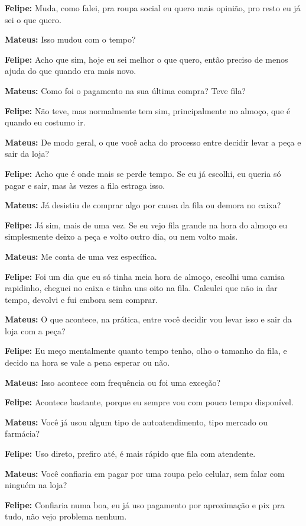 \textbf{Felipe:} Muda, como falei, pra roupa social eu quero mais opinião, pro resto eu já sei o que quero.

\textbf{Mateus:} Isso mudou com o tempo?

\textbf{Felipe:} Acho que sim, hoje eu sei melhor o que quero, então preciso de menos ajuda do que quando era mais novo.

\textbf{Mateus:} Como foi o pagamento na sua última compra? Teve fila?

\textbf{Felipe:} Não teve, mas normalmente tem sim, principalmente no almoço, que é quando eu costumo ir.

\textbf{Mateus:} De modo geral, o que você acha do processo entre decidir levar a peça e sair da loja?

\textbf{Felipe:} Acho que é onde mais se perde tempo. Se eu já escolhi, eu queria só pagar e sair, mas às vezes a fila estraga isso.

\textbf{Mateus:} Já desistiu de comprar algo por causa da fila ou demora no caixa?

\textbf{Felipe:} Já sim, mais de uma vez. Se eu vejo fila grande na hora do almoço eu simplesmente deixo a peça e volto outro dia, ou nem volto mais.

\textbf{Mateus:} Me conta de uma vez específica.

\textbf{Felipe:} Foi um dia que eu só tinha meia hora de almoço, escolhi uma camisa rapidinho, cheguei no caixa e tinha uns oito na fila. Calculei que não ia dar tempo, devolvi e fui embora sem comprar.

\textbf{Mateus:} O que acontece, na prática, entre você decidir vou levar isso e sair da loja com a peça?

\textbf{Felipe:} Eu meço mentalmente quanto tempo tenho, olho o tamanho da fila, e decido na hora se vale a pena esperar ou não.

\textbf{Mateus:} Isso acontece com frequência ou foi uma exceção?

\textbf{Felipe:} Acontece bastante, porque eu sempre vou com pouco tempo disponível.

\textbf{Mateus:} Você já usou algum tipo de autoatendimento, tipo mercado ou farmácia?

\textbf{Felipe:} Uso direto, prefiro até, é mais rápido que fila com atendente.

\textbf{Mateus:} Você confiaria em pagar por uma roupa pelo celular, sem falar com ninguém na loja?

\textbf{Felipe:} Confiaria numa boa, eu já uso pagamento por aproximação e pix pra tudo, não vejo problema nenhum.

